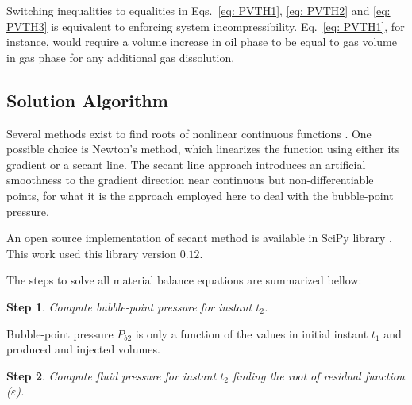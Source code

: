 \documentclass[authoryear,preprint,review,12pt]{elsarticle}
\newtheorem{step}{Step}
\begin{document}
Switching inequalities to equalities in Eqs.~\eqref{eq: PVTH1}, \eqref{eq: PVTH2} and \eqref{eq: PVTH3} is equivalent to enforcing system incompressibility. Eq.~\eqref{eq: PVTH1}, for instance, would require a volume increase in oil phase to be equal to gas volume in gas phase for any additional gas dissolution.

\subsection{Solution Algorithm}
Several methods exist to find roots of nonlinear continuous functions \citep{hamming1987numerical}. One possible choice is Newton's method, which linearizes the function using either its gradient or a secant line. The secant line approach introduces an artificial smoothness to the gradient direction near continuous but non-differentiable points, for what it is the approach employed here to deal with the bubble-point pressure.

An open source implementation of secant method is available in SciPy library \citep{scipy}. This work used this library version $0.12$.




The steps to solve all material balance equations are summarized bellow:
\begin{step}
Compute bubble-point pressure for instant $t_2$.
\end{step}

Bubble-point pressure $P_{b2}$ is only a function of the values in initial instant $t_1$ and produced and injected volumes.

\begin{step}
Compute fluid pressure for instant $t_2$ finding the root of residual function ($\varepsilon$).
\end{step}
\end{document}
